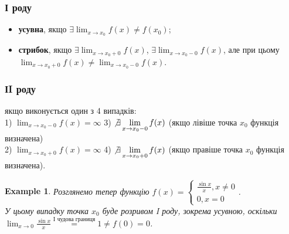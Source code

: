 \documentclass[a4paper, 14pt]{article}
\theoremstyle{theoremdd}
\theoremstyle{theoremdd}
\theoremstyle{theoremdd}
\theoremstyle{theoremdd}
\newtheorem{example}[theorem]{Example}
\theoremstyle{theoremdd}
\theoremstyle{theoremdd}
\theoremstyle{theoremdd}
\theoremstyle{theoremdd}
\begin{document}
\subsubsection*{І роду}
\begin{itemize}[nosep,wide=0pt,label={-}]
\item \textbf{усувна}, якщо $\exists \displaystyle \lim_{x \to x_0} f(x) \neq f(x_0)$;
\item \textbf{стрибок}, якщо $\exists \displaystyle \lim_{x \to x_0+0} f(x)$, $\exists \displaystyle \lim_{x \to x_0-0} f(x)$, але при цьому $\displaystyle \lim_{x \to x_0+0} f(x) \neq \lim_{x \to x_0-0} f(x)$.
\end{itemize}

\subsubsection*{ІI роду}
якщо виконується один з 4 випадків:\\
1) $\displaystyle \lim_{x \to x_0-0} f(x) = \infty$ \hspace{2cm} 3) $\displaystyle \not\exists \lim_{x \to x_0-0} f(x)$ (якщо лівіше точка $x_0$ функція визначена)\\
2) $\displaystyle \lim_{x \to x_0+0} f(x) = \infty$ \hspace{2cm} 4) $\displaystyle \not\exists \lim_{x \to x_0+0} f(x)$ (якщо правіше точка $x_0$ функція визначена).

\begin{example}
Розглянемо тепер функцію $f(x) = \begin{cases} \displaystyle \frac{\sin x}{x}, x \neq 0 \\ 0, x = 0 \end{cases}$.\\
У цьому випадку точка $x_0$ буде розривом I роду, зокрема усувною, оскільки\\
$\displaystyle \lim_{x \to 0} \frac{\sin x}{x} \overset{\textrm{I чудова границя}}{=} 1 \neq f(0) = 0$.
\\ %
\end{example}
\end{document}
